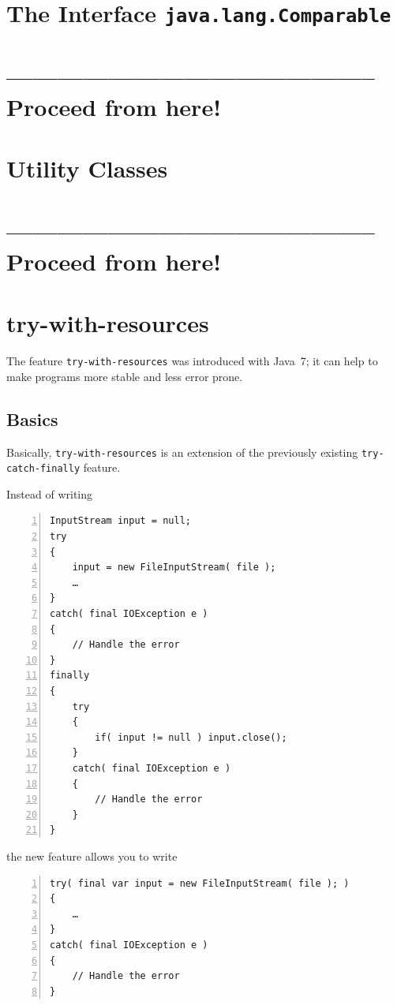 \documentclass[11pt,a4paper, titlepage, parskip=half, headsepline, footsepline, cleardoublepage=current, headheight=1cm]{scrbook}
\begin{document}
\lipsum[1]

\section{The Interface \lstinline|java.lang.Comparable|}\label{sec:ComparableInterface}
\section{-------------------------------------------- Proceed from here!}
\lipsum[5]

\section{Utility Classes}\label{sec:UtilityClasses}
\section{-------------------------------------------- Proceed from here!}
\lipsum[5]

\section{try-with-resources}\label{sec:TryWithResources}
The feature \lstinline|try-with-resources| was introduced with Java~7; it can help to make programs more stable and less error prone.

\subsection{Basics}
Basically, \lstinline|try-with-resources|\autocite{ORACLE_DOC_LANGUAGE_SPECIFICATION:TryWithResources} is an extension of the previously existing \lstinline|try-catch-finally| feature.

Instead of writing
\begin{lstlisting}[numbers=left]
InputStream input = null;
try
{
    input = new FileInputStream( file );
    …
}
catch( final IOException e )
{
    // Handle the error
}
finally
{
    try
    {
        if( input != null ) input.close();
    }
    catch( final IOException e )
    {
        // Handle the error
    }
}
\end{lstlisting}

the new feature allows you to write

\begin{lstlisting}[numbers=left]
try( final var input = new FileInputStream( file ); )
{
    …
}
catch( final IOException e )
{
    // Handle the error
}
\end{lstlisting}
\end{document}
